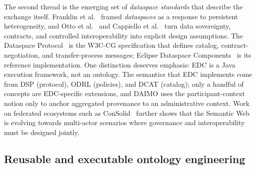 \documentclass[11pt,a4paper]{article}
\begin{document}
The second thread is the emerging set of \emph{dataspace standards} that describe the exchange itself. Franklin et al.~\cite{franklin05} framed \emph{dataspaces} as a response to persistent heterogeneity, and Otto et al.~\cite{otto19} and Cappiello et al.~\cite{cappiello22} turn data sovereignty, contracts, and controlled interoperability into explicit design assumptions. The Dataspace Protocol~\cite{dsp} is the W3C-CG specification that defines catalog, contract-negotiation, and transfer-process messages; Eclipse Dataspace Components~\cite{edc} is its reference implementation. One distinction deserves emphasis: EDC is a Java execution framework, not an ontology. The semantics that EDC implements come from DSP (protocol), ODRL (policies), and DCAT (catalog); only a handful of concepts are EDC-specific extensions, and DAIMO uses the participant-context notion only to anchor aggregated provenance to an administrative context. Work on federated ecosystems such as ConSolid~\cite{werbrouck24} further shows that the Semantic Web is evolving towards multi-actor scenarios where governance and interoperability must be designed jointly.

\subsection{Reusable and executable ontology engineering}
\end{document}
